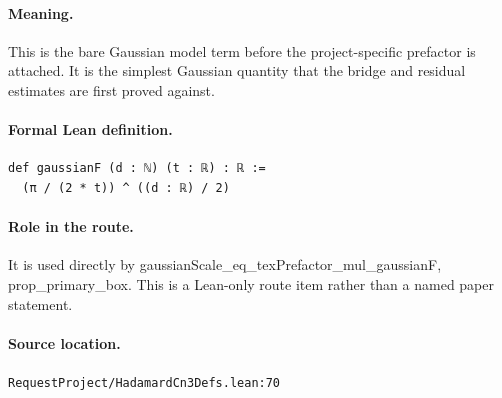 \medskip
\paragraph{Meaning.}
This is the bare Gaussian model term before the project-specific prefactor is attached. It is the simplest Gaussian quantity that the bridge and residual estimates are first proved against.
\paragraph{Formal Lean definition.}
\begin{verbatim}
def gaussianF (d : ℕ) (t : ℝ) : ℝ :=
  (π / (2 * t)) ^ ((d : ℝ) / 2)
\end{verbatim}
\paragraph{Role in the route.}
It is used directly by gaussianScale\_eq\_texPrefactor\_mul\_gaussianF, prop\_primary\_box. This is a Lean-only route item rather than a named paper statement.
\paragraph{Source location.}
\texttt{RequestProject/HadamardCn3Defs.lean:70}
\medskip

